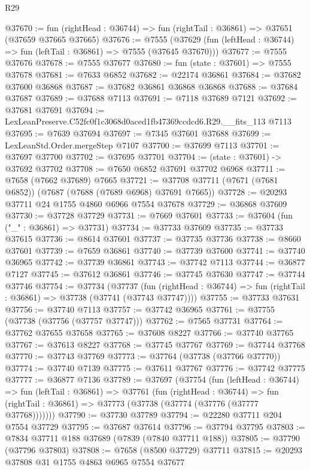\begin{lexlean}{R29}
\begin{coremodule}
@37670 := fun (rightHead : @36744) => fun (rightTail : @36861) => @37651 (@37659 @37665 @37665)
@37676 := @7555
    (@37629 (fun (leftHead : @36744) => fun (leftTail : @36861) => @7555 (@37645 @37670)))
@37677 := @7555 @37676
@37678 := @7555 @37677
@37680 := fun (state : @37601) => @7555 @37678
@37681 := @7633 @6852
@37682 := @22174 @36861
@37684 := @37682 @37600 @36868
@37687 := @37682 @36861 @36868 @36868
@37688 := @37684 @37687
@37689 := @37688 @7113
@37691 := @7118 @37689 @7121
@37692 := @37681 @37691
@37694 := LexLeanPreserve.C52fc0f1c3068d0aced1fb47369ccdcd6.R29.__fits_113 @7113
@37695 := @7639 @37694
@37697 := @7345 @37601 @37688
@37699 := LexLeanStd.Order.mergeStep @7107
@37700 := @37699 @7113
@37701 := @37697 @37700
@37702 := @37695 @37701
@37704 := (state : @37601) -> @37692 @37702
@37708 := @7650 @6852 @37691 @37702 @6968
@37711 := @7658 (@7662 @37689) @7665
@37721 := @37708 @37711 (@7671 (@7681 @6852)) (@7687 (@7688 (@7689 @6968) @37691 @7665))
@37728 := @20293 @37711 @24 @1755 @4860 @6966 @7554 @37678
@37729 := @36868 @37609
@37730 := @37728 @37729
@37731 := @7669 @37601
@37733 := @37604 (fun ("_" : @36861) => @37731)
@37734 := @37733 @37609
@37735 := @37733 @37615
@37736 := @8614 @37601
@37737 := @37735 @37736
@37738 := @8660 @37601
@37739 := @7659 @36861
@37740 := @37739 @37600
@37741 := @37740 @36965
@37742 := @37739 @36861
@37743 := @37742 @7113
@37744 := @36877 @7127
@37745 := @37612 @36861
@37746 := @37745 @37630
@37747 := @37744 @37746
@37754 := @37734
    (@37737
      (fun (rightHead : @36744) => fun (rightTail : @36861) => @37738 (@37741 (@37743 @37747))))
@37755 := @37733 @37631
@37756 := @37740 @7113
@37757 := @37742 @36965
@37761 := @37755 (@37738 (@37756 (@37757 @37747)))
@37762 := @7565 @37731
@37764 := @37762 @37655 @37658
@37765 := @37608 @8227
@37766 := @37740 @37765
@37767 := @37613 @8227
@37768 := @37745 @37767
@37769 := @37744 @37768
@37770 := @37743 @37769
@37773 := @37764 (@37738 (@37766 @37770))
@37774 := @37740 @7139
@37775 := @37611 @37767
@37776 := @37742 @37775
@37777 := @36877 @7136
@37789 := @37697
    (@37754
      (fun (leftHead : @36744) =>
      fun (leftTail : @36861) =>
      @37761
        (fun (rightHead : @36744) =>
        fun (rightTail : @36861) => @37773 (@37738 (@37774 (@37776 (@37777 @37768)))))))
@37790 := @37730 @37789
@37794 := @22280 @37711 @204 @7554 @37729
@37795 := @37687 @37614
@37796 := @37794 @37795
@37803 := @7834 @37711 @188 @37689 (@7839 (@7840 @37711 @188))
@37805 := @37790 (@37796 @37803)
@37808 := @7658 (@8500 @37729) @37711
@37815 := @20293 @37808 @31 @1755 @4863 @6965 @7554 @37677

\end{coremodule}
\end{lexlean}
